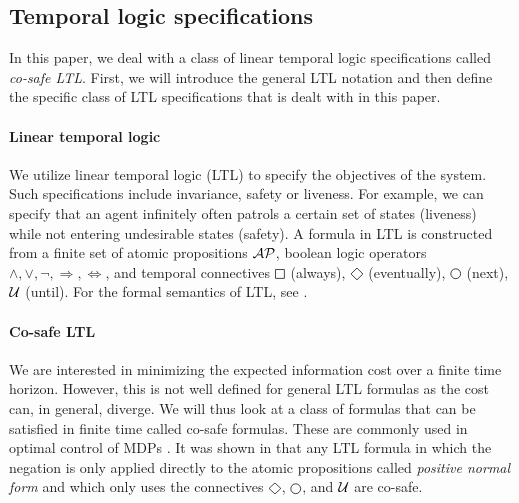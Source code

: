 \subsection{Temporal logic specifications} In this paper, we deal with a class of linear temporal logic specifications called \emph{co-safe LTL}. First, we will introduce the general LTL notation and then define the specific class of LTL specifications that is dealt with in this paper.

\paragraph*{Linear temporal logic} We utilize linear temporal logic (LTL) to specify the objectives of the system. Such specifications include invariance, safety or liveness. For example, we can specify that an agent infinitely often patrols a certain set of states (liveness) while not entering undesirable states (safety). A formula in LTL is constructed from a finite set of atomic propositions $\mathcal{AP}$, boolean logic operators $\wedge,\vee,\lnot,\Rightarrow,\Leftrightarrow$, and temporal connectives $\LTLsquare$ (always), $\LTLdiamond$ (eventually), $\LTLcircle$ (next), $\operatorname{\mathcal{U}}$ (until). For the formal semantics of LTL, see \cite{BaierKatoen08}.

\paragraph*{Co-safe LTL} We are interested in minimizing the expected information cost over a finite time horizon. However, this is not well defined for general LTL formulas as the cost can, in general, diverge. We will thus look at a class of formulas that can be satisfied in finite time called co-safe formulas. These are commonly used in optimal control of MDPs \cite{Lacerda14}. It was shown in \cite{kupferman2001model} that any LTL formula in which the negation is only applied directly to the atomic propositions called \emph{positive normal form} and which only uses the connectives $\LTLdiamond$, $\LTLcircle$, and $\operatorname{\mathcal{U}}$ are co-safe. 

